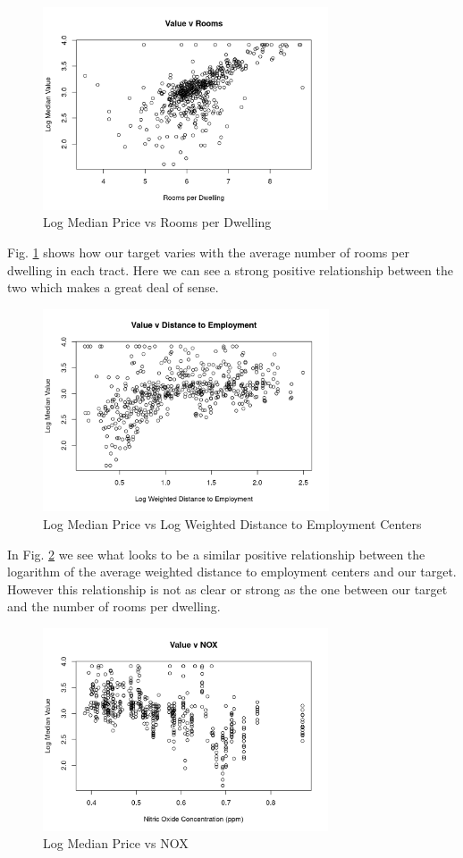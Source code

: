 \documentclass[11pt]{article}
\begin{document}
\begin{figure}[h!] 
  \centering
  \includegraphics[height=60mm]{rooms.png}
  \caption{Log Median Price vs Rooms per Dwelling}
  \label{fig:rooms}
\end{figure}

\FloatBarrier


Fig. \ref{fig:rooms} shows how our target varies with the average number of rooms per dwelling in each tract. Here we can see a strong positive relationship between the two which makes a great deal of sense. 

\begin{figure}[h!] 
  \centering
  \includegraphics[height=60mm]{employment.png}
  \caption{Log Median Price vs Log Weighted Distance to Employment Centers}
  \label{fig:employment}
\end{figure}

\FloatBarrier

In Fig. \ref{fig:employment} we see what looks to be a similar positive relationship between the logarithm of the average weighted distance to employment centers and our target. However this relationship is not as clear or strong as the one between our target and the number of rooms per dwelling. 

\begin{figure}[h!] 
	\centering
  \includegraphics[height=60mm]{nox.png}
  \caption{Log Median Price vs NOX}
  \label{fig:nox}
\end{figure}
\end{document}
